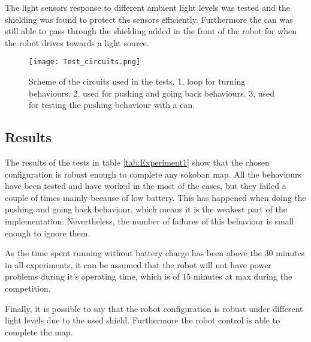 The light sensors response to different ambient light levels was tested and the shielding was found to protect the sensors efficiently.
Furthermore the can was still able to pass through the shielding added in the front of the robot for when the robot drives towards a light source.


\begin{figure}[H]
\texttt{[image: Test\_circuits.png]}
\centering
\caption{Scheme of the circuits used in the tests. 1, loop for turning behaviours. 2, used for pushing and going back behaviours. 3, used for testing the pushing behaviour with a can. }
\label{fig:testMaps}
\end{figure}


\subsection{Results}
	The results of the tests in table \ref{tab:Experiment1} show that the chosen configuration is robust enough to complete any sokoban map.
	All the behaviours have been tested and have worked in the most of the cases, but they failed a couple of times mainly because of low battery.
	This has happened when doing the pushing and going back behaviour, which means it is the weakest part of the implementation.
	Nevertheless, the number of failures of this behaviour is small enough to ignore them.
	
	As the time spent running without battery charge has been above the 30 minutes in all experiments, it can be assumed that the robot will not have power problems during it's operating time, which is of 15 minutes at max during the competition.
	
	
	Finally, it is possible to say that the robot configuration is robust under different light levels due to the used shield.
	Furthermore the robot control is able to complete the map.


